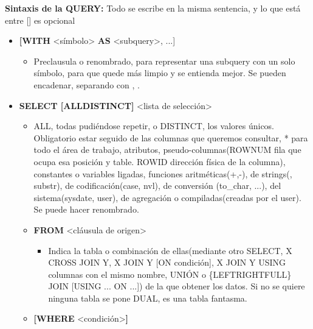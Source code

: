 \documentclass[12pt, twoside, openright]{report} %
\begin{document}
  
  \textbf{Sintaxis de la QUERY:} Todo se escribe en la misma sentencia,
  y lo que está entre {[}{]} es opcional
  

  \begin{itemize}
  \item \textbf{{[}WITH} \textless símbolo\textgreater{} \textbf{AS}
    \textless subquery\textgreater, ...{]}
    

    \begin{itemize}
    \item Preclausula o renombrado, para representar una subquery con un
      solo símbolo, para que quede más limpio y se entienda mejor. Se
      pueden encadenar, separando con , .
      
    \end{itemize}
  \item \textbf{SELECT {[}ALL\textbar DISTINCT{]}} \textless lista de
    selección\textgreater{}
    

    \begin{itemize}
    \item ALL, todas pudiéndose repetir, o DISTINCT, los valores únicos.
      Obligatorio estar seguido de las columnas que queremos consultar,
      * para todo el área de trabajo, atributos, pseudo-columnas(ROWNUM
      fila que ocupa esa posición y table. ROWID dirección física de la
      columna), constantes o variables ligadas, funciones
      aritméticas(+,-), de strings(\textbar\textbar, substr), de
      codificación(case, nvl), de conversión (to\_char, ...), del
      sistema(sysdate, user), de agregación o compiladas(creadas por el
      user). Se puede hacer renombrado.
      
    \end{itemize}

    \begin{itemize}
    \item \textbf{FROM} \textless cláusula de origen\textgreater{}
      

      \begin{itemize}
      \item Indica la tabla o combinación de ellas(mediante otro SELECT, X
        CROSS JOIN Y, X JOIN Y {[}ON condición{]}, X JOIN Y USING
        columnas con el mismo nombre, UNIÓN o
        \{LEFT\textbar RIGHT\textbar FULL\} JOIN {[}USING ...\textbar{}
        ON ...{]}) de la que obtener los datos. Si no se quiere ninguna
        tabla se pone DUAL, es una tabla fantasma.
        
      \end{itemize}
    \item \textbf{{[}WHERE} \textless condición\textgreater{}\textbf{{]}}
      


\end{itemize}
\end{itemize}
\end{document}
